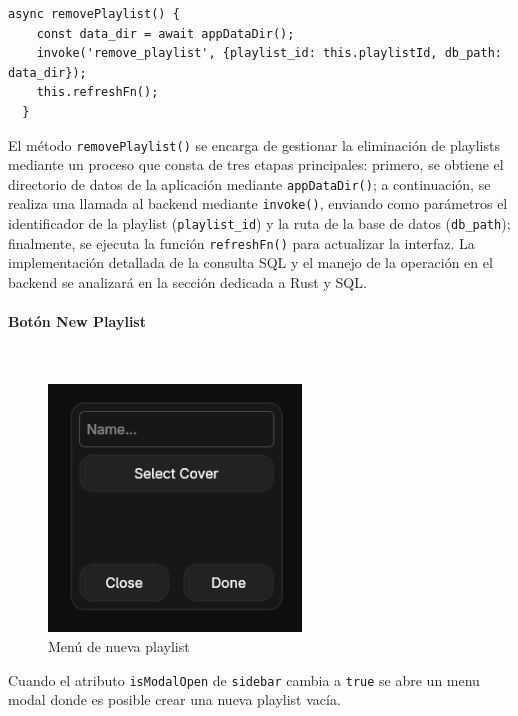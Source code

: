 \documentclass[11pt, a4paper]{article}
\begin{document}
                \begin{lstlisting}[caption={removePlaylist()}]
async removePlaylist() {
    const data_dir = await appDataDir();
    invoke('remove_playlist', {playlist_id: this.playlistId, db_path: data_dir});
    this.refreshFn();
  }
                \end{lstlisting}

                El método \verb|removePlaylist()| se encarga de gestionar la eliminación de playlists mediante un proceso que consta de tres etapas principales: primero, se obtiene el directorio de datos de la aplicación mediante \verb|appDataDir()|; a continuación, se realiza una llamada al backend mediante \verb|invoke()|, enviando como parámetros el identificador de la playlist (\verb|playlist_id|) y la ruta de la base de datos (\verb|db_path|); finalmente, se ejecuta la función \verb|refreshFn()| para actualizar la interfaz. La implementación detallada de la consulta SQL y el manejo de la operación en el backend se analizará en la sección dedicada a Rust y SQL.

                \paragraph{Botón New Playlist}
                ‎ \\

                \begin{figure}[H]
                    \centering
                    \includegraphics[width=0.6\textwidth]{media/screenshots/new_playlist.png}
                    \caption{Menú de nueva playlist}
                    \label{fig:nueva playlist}
                \end{figure}

                Cuando el atributo \verb|isModalOpen| de \verb|sidebar| cambia a \verb|true| se abre un menu modal donde es posible crear una nueva playlist vacía.
\end{document}
